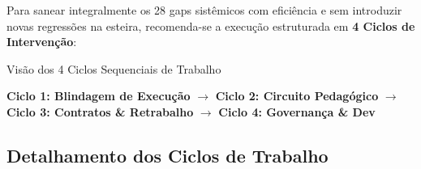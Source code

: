 \documentclass[11pt,a4paper]{article}
\begin{document}
Para sanear integralmente os 28 gaps sistêmicos com eficiência e sem introduzir novas regressões na esteira, recomenda-se a execução estruturada em \textbf{4 Ciclos de Intervenção}:

\begin{destaquebox}{Visão dos 4 Ciclos Sequenciais de Trabalho}
\begin{center}
\textbf{Ciclo 1: Blindagem de Execução} $\longrightarrow$ \textbf{Ciclo 2: Circuito Pedagógico} $\longrightarrow$ \textbf{Ciclo 3: Contratos \& Retrabalho} $\longrightarrow$ \textbf{Ciclo 4: Governança \& Dev}
\end{center}
\end{destaquebox}

\subsection{Detalhamento dos Ciclos de Trabalho}
\end{document}
